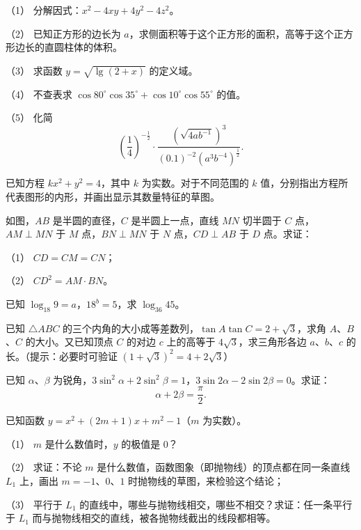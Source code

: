 \begin{question}
（1） 分解因式：$x^2-4xy+4y^2-4z^2$。

（2） 已知正方形的边长为 $a$，求侧面积等于这个正方形的面积，高等于这个正方形边长的直圆柱体的体积。

（3） 求函数 $y=\sqrt{\lg(2+x)}$ 的定义域。

（4） 不查表求 $\cos 80^\circ\cos 35^\circ+\cos 10^\circ\cos 55^\circ$ 的值。

（5） 化简
\nopagebreak[4]
\[
\left(\frac14\right)^{-\frac12}\cdot\frac{\left(\sqrt{4ab^{-1}}\right)^3}{(0.1)^{-2}\left(a^3b^{-4}\right)^{\frac12}}.
\]

\end{question}
\begin{question}
已知方程 $kx^2+y^2=4$，其中 $k$ 为实数。对于不同范围的 $k$ 值，分别指出方程所代表图形的内形，并画出显示其数量特征的草图。

\Needspace{0.4\textheight}
\end{question}
\begin{question}
如图，$AB$ 是半圆的直径，$C$ 是半圆上一点，直线 $MN$ 切半圆于 $C$ 点，$AM\perp MN$ 于 $M$ 点，$BN\perp MN$ 于 $N$ 点，$CD\perp AB$ 于 $D$ 点。求证：

（1） $CD=CM=CN$；

（2） $CD^2=AM\cdot BN$。
\nopagebreak[4]
\begin{center}\end{center}
\nopagebreak[4]
\end{question}
\begin{question}
已知 $\log_{18}9=a$，$18^b=5$，求 $\log_{36}45$。

\end{question}
\begin{question}
已知 $\triangle ABC$ 的三个内角的大小成等差数列，$\tan A\tan C=2+\sqrt3$，求角 $A$、$B$、$C$ 的大小。又已知顶点 $C$ 的对边 $c$ 上的高等于 $4\sqrt3$，求三角形各边 $a$、$b$、$c$ 的长。（提示：必要时可验证 $(1+\sqrt3)^2=4+2\sqrt3$）

\end{question}
\begin{question}
已知 $\alpha$、$\beta$ 为锐角，$3\sin^2\alpha+2\sin^2\beta=1$，$3\sin 2\alpha-2\sin 2\beta=0$。求证：
\nopagebreak[4]
\[
\alpha+2\beta=\frac{\pi}{2}.
\]

\end{question}
\begin{question}
已知函数 $y=x^2+(2m+1)x+m^2-1$（$m$ 为实数）。

（1） $m$ 是什么数值时，$y$ 的极值是 $0$？

（2） 求证：不论 $m$ 是什么数值，函数图象（即抛物线）的顶点都在同一条直线 $L_1$ 上，画出 $m=-1$、$0$、$1$ 时抛物线的草图，来检验这个结论；

（3） 平行于 $L_1$ 的直线中，哪些与抛物线相交，哪些不相交？求证：任一条平行于 $L_1$ 而与抛物线相交的直线，被各抛物线截出的线段都相等。

\end{question}